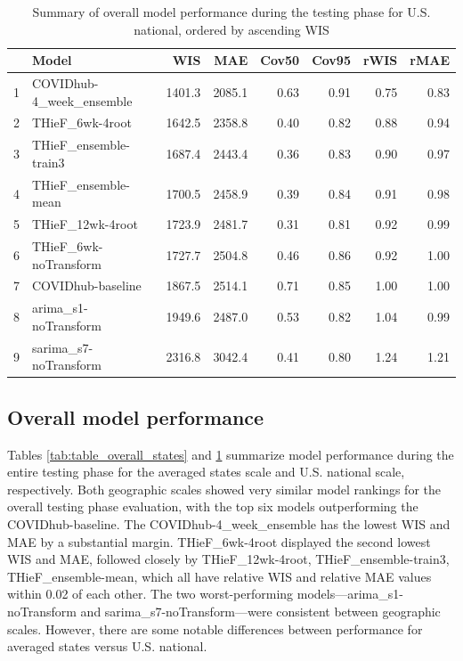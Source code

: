 \documentclass[thesis]{umassthesis}  %
\begin{document}
\begin{table}[h]
\begin{center}
\caption{Summary of overall model performance during the testing phase for U.S. national, ordered by ascending WIS}
\label{tab:table_overall_us}
\begin{tabular}{rlrrrrrr}
  \hline
 & Model & WIS & MAE & Cov50 & Cov95 & rWIS & rMAE \\ 
  \hline
1 & COVIDhub-4\_week\_ensemble & 1401.3 & 2085.1 & 0.63 & 0.91 & 0.75 & 0.83 \\ 
  2 & THieF\_6wk-4root & 1642.5 & 2358.8 & 0.40 & 0.82 & 0.88 & 0.94 \\ 
  3 & THieF\_ensemble-train3 & 1687.4 & 2443.4 & 0.36 & 0.83 & 0.90 & 0.97 \\ 
  4 & THieF\_ensemble-mean & 1700.5 & 2458.9 & 0.39 & 0.84 & 0.91 & 0.98 \\ 
  5 & THieF\_12wk-4root & 1723.9 & 2481.7 & 0.31 & 0.81 & 0.92 & 0.99 \\ 
  6 & THieF\_6wk-noTransform & 1727.7 & 2504.8 & 0.46 & 0.86 & 0.92 & 1.00 \\ 
  7 & COVIDhub-baseline & 1867.5 & 2514.1 & 0.71 & 0.85 & 1.00 & 1.00 \\ 
  8 & arima\_s1-noTransform & 1949.6 & 2487.0 & 0.53 & 0.82 & 1.04 & 0.99 \\ 
  9 & sarima\_s7-noTransform & 2316.8 & 3042.4 & 0.41 & 0.80 & 1.24 & 1.21 \\ 
   \hline
\end{tabular}\end{center}
\end{table}

\subsection{Overall model performance} \label{testing_overall}
Tables \ref{tab:table_overall_states} and \ref{tab:table_overall_us} summarize model performance during the entire testing phase for the averaged states scale and U.S. national scale, respectively. Both geographic scales showed very similar model rankings for the overall testing phase evaluation, with the top six models outperforming the COVIDhub-baseline. The COVIDhub-4\_week\_ensemble has the lowest WIS and MAE by a substantial margin. THieF\_6wk-4root displayed the second lowest WIS and MAE, followed closely by THieF\_12wk-4root, THieF\_ensemble-train3, THieF\_ensemble-mean, which all have relative WIS and relative MAE values within 0.02 of each other. The two worst-performing models---arima\_s1-noTransform and sarima\_s7-noTransform---were consistent between geographic scales. However, there are some notable differences between performance for averaged states versus U.S. national.
\end{document}

